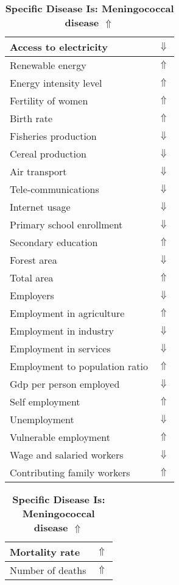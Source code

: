 \documentclass[12pt,notitlepage,oneside]{report}
\begin{document}
\begin{table}[!htb]
\caption{\textbf{Specific Disease Is: Meningococcal disease $\Uparrow$}}
\centering
\label{Correlated Socio-economic Factors0}
\begin{tabular}{|l|l|}
\hline
Access to electricity & $\Downarrow$\\ \hline
Renewable energy & $\Uparrow$\\ \hline
Energy intensity level & $\Uparrow$\\ \hline
Fertility of women & $\Uparrow$\\ \hline
Birth rate & $\Uparrow$\\ \hline
Fisheries production & $\Downarrow$\\ \hline
Cereal production & $\Downarrow$\\ \hline
Air transport  & $\Downarrow$\\ \hline
Tele-communications & $\Downarrow$\\ \hline
Internet usage & $\Downarrow$\\ \hline
Primary school enrollment & $\Downarrow$\\ \hline
Secondary education & $\Uparrow$\\ \hline
Forest area & $\Downarrow$\\ \hline
Total area & $\Uparrow$\\ \hline
Employers & $\Downarrow$\\ \hline
Employment in agriculture & $\Uparrow$\\ \hline
Employment in industry & $\Downarrow$\\ \hline
Employment in services & $\Downarrow$\\ \hline
Employment to population ratio & $\Uparrow$\\ \hline
Gdp per person employed & $\Downarrow$\\ \hline
Self employment & $\Uparrow$\\ \hline
Unemployment & $\Downarrow$\\ \hline
Vulnerable employment & $\Uparrow$\\ \hline
Wage and salaried workers & $\Downarrow$\\ \hline
Contributing family workers & $\Uparrow$\\ \hline
\end{tabular}
\begin{tabular}{|l|l|}
\hline
Mortality rate & $\Uparrow$\\ \hline
Number of deaths & $\Uparrow$\\ \hline

\end{tabular}
\end{table}
\end{document}
